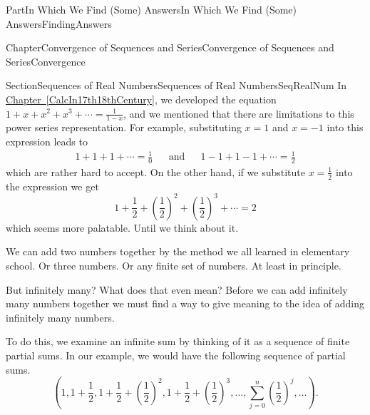 \documentclass[oneside,10pt,]{book}
\newcommand{\xreffont}{\relax}
\numberwithin{equation}{part}
\newcommand{\amp}{&}
\begin{document}
\typeout{************************************************}
%
\begin{partptx}{Part}{In Which We Find (Some) Answers}{}{In Which We Find (Some) Answers}{}{}{FindingAnswers}
\renewcommand*{\partname}{Part}
%
%
\typeout{************************************************}
\typeout{************************************************}
%
\begin{chapterptx}{Chapter}{Convergence of Sequences and Series}{}{Convergence of Sequences and Series}{}{}{Convergence}
\renewcommand*{\chaptername}{Chapter}
%
%
\typeout{************************************************}
\typeout{************************************************}
%
\begin{sectionptx}{Section}{Sequences of Real Numbers}{}{Sequences of Real Numbers}{}{}{SeqRealNum}
In \hyperref[CalcIn17th18thCentury]{Chapter~{\xreffont\ref{CalcIn17th18thCentury}}}, we developed the equation \(1+x+x^2+x^3+\cdots=\frac{1}{1-x}\), and we mentioned that there are  limitations to this power series representation.  For example, substituting \(x=1\) and \(x=-1\) into this expression leads to%
\begin{align*}
1+1+1+\cdots=\frac{1}{0}\amp{}\amp{} \text{and}\amp{}\amp{}  1-1+1-1+\cdots=\frac{1}{2}
\end{align*}
which are rather hard to accept.  On the other hand, if we substitute \(x=\frac{1}{2}\) into the expression we get%
\begin{equation*}
1+\frac{1}{2}+\left(\frac{1}{2}\right)^2+\left(\frac{1}{2}\right)^3+\cdots=2
\end{equation*}
which seems more palatable. Until we think about it.%
\par
We can add two numbers together by the method we all learned in elementary school.  Or three numbers.  Or any finite set of numbers. At least in principle.%
\par
But infinitely many?  What does that even mean?  Before we can add infinitely many numbers together we must find a way to give meaning to the idea of adding infinitely many numbers.%
\par
To do this, we examine an infinite sum by thinking of it as a sequence of finite partial sums. In our example, we would have the following sequence of partial sums.%
\begin{equation*}
\left(1,1+\frac{1}{2},1+\frac{1}{2}+\left(\frac{1}{2}\right)^2,1+ \frac{1}{2}+\left(\frac{1}{2}\right)^3,\ldots,\sum_{j=0}^n\left(\frac{1}{2} \right)^j,\ldots\right)\text{.}

\end{equation*}
\end{sectionptx}
\end{chapterptx}
\end{partptx}
\end{document}
